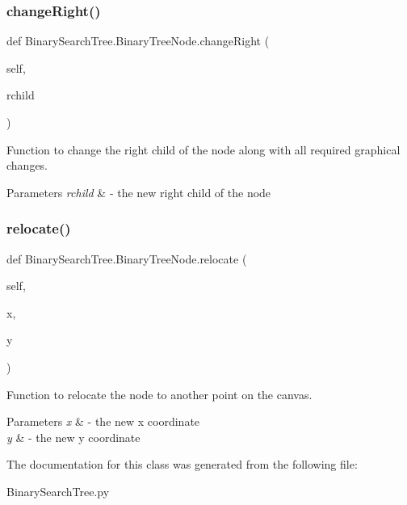 \subsubsection{\texorpdfstring{change\+Right()}{changeRight()}}
{\footnotesize\ttfamily def Binary\+Search\+Tree.\+Binary\+Tree\+Node.\+change\+Right (\begin{DoxyParamCaption}\item[{}]{self,  }\item[{}]{rchild }\end{DoxyParamCaption})}



Function to change the right child of the node along with all required graphical changes. 


\begin{DoxyParams}{Parameters}
{\em rchild} & -\/ the new right child of the node \\
\hline
\end{DoxyParams}
\mbox{\label{class_binary_search_tree_1_1_binary_tree_node_aa7b30f6a083e5eb57d4048c6a83bfff1}} 
\subsubsection{\texorpdfstring{relocate()}{relocate()}}
{\footnotesize\ttfamily def Binary\+Search\+Tree.\+Binary\+Tree\+Node.\+relocate (\begin{DoxyParamCaption}\item[{}]{self,  }\item[{}]{x,  }\item[{}]{y }\end{DoxyParamCaption})}



Function to relocate the node to another point on the canvas. 


\begin{DoxyParams}{Parameters}
{\em x} & -\/ the new x coordinate \\
\hline
{\em y} & -\/ the new y coordinate \\
\hline
\end{DoxyParams}


The documentation for this class was generated from the following file\+:\begin{DoxyCompactItemize}
\item 
Binary\+Search\+Tree.\+py\end{DoxyCompactItemize}
